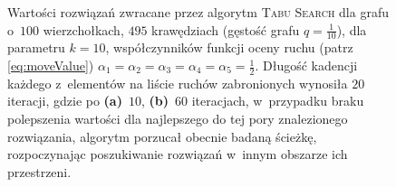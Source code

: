 \begin{figure}[!htbp]
\begin{subfigure}[b]{0.45\textwidth}
		\caption{}
		\label{fig:rrimst1:b}
	\end{subfigure}
	\hfill\null
	\caption{
		Wartości rozwiązań zwracane przez algorytm \textsc{Tabu Search} dla grafu o~$100$ wierzchołkach, $495$ krawędziach (gęstość grafu $q = \frac{1}{10}$), dla parametru $k = 10$, współczynników funkcji oceny ruchu (patrz \ref{eq:moveValue}) $\alpha_{1} = \alpha_{2} = \alpha_{3} = \alpha_{4} = \alpha_{5} = \frac{1}{2}$. Długość kadencji każdego z~elementów na liście ruchów zabronionych wynosiła $20$ iteracji, gdzie po \textbf{(a)}~$10$, \textbf{(b)}~$60$ iteracjach, w~przypadku braku polepszenia wartości dla najlepszego do tej pory znalezionego rozwiązania, algorytm porzucał obecnie badaną ścieżkę, rozpoczynając poszukiwanie rozwiązań w~innym obszarze ich przestrzeni.
	}
\end{figure}

